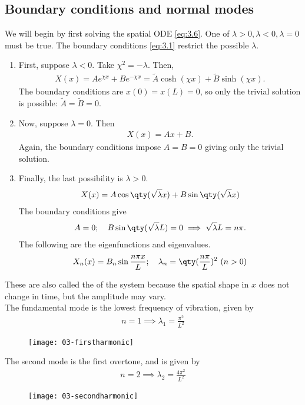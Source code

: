 \subsection{Boundary conditions and normal modes}
We will begin by first solving the spatial ODE \cref{eq:3.6}.
One of $\lambda > 0, \lambda < 0, \lambda = 0$ must be true.
The boundary conditions \cref{eq:3.1} restrict the possible $\lambda$.
\begin{enumerate}
	\item First, suppose $\lambda < 0$.
	      Take $\chi^2 = -\lambda$.
	      Then,
	      \begin{align*}
		      X(x) = Ae^{\chi x} + Be^{-\chi x} = \tilde A \cosh (\chi x) + \tilde B \sinh (\chi x).
	      \end{align*}
	      The boundary conditions are $x(0) = x(L) = 0$, so only the trivial solution is possible: $\tilde A = \tilde B = 0$.
	\item Now, suppose $\lambda = 0$.
	      Then
	      \begin{align*}
		      X(x) = Ax + B.
	      \end{align*}
	      Again, the boundary conditions impose $A = B = 0$ giving only the trivial solution.
	\item Finally, the last possibility is $\lambda > 0$.
	      \begin{align*}
		      X(x) = A \cos \qty(\sqrt{\lambda} x) + B \sin \qty(\sqrt{\lambda} x)
	      \end{align*}
	      The boundary conditions give
	      \begin{align*}
		      A = 0;\quad B \sin \qty(\sqrt{\lambda} L) = 0 \implies \sqrt{\lambda} L = n \pi.
	      \end{align*}
		  The following are the eigenfunctions and eigenvalues.
		\begin{align}
			X_n(x) = B_n \sin \frac{n \pi x}{L};\quad \lambda_n = \qty(\frac{n \pi}{L})^2 \ (n > 0) \label{eq:3.8}
		\end{align}
\end{enumerate}

These are also called the  of the system because the spatial shape in $x$ does not change in time, but the amplitude may vary. \\
The fundamental mode is the lowest frequency of vibration, given by
\begin{align*}
	n = 1 \implies \lambda_1 = \frac{\pi^2}{L^2}
\end{align*}
\begin{figure}[h] 
    \centering 
    \texttt{[image: 03-firstharmonic]} 
\end{figure}
The second mode is the first overtone, and is given by
\begin{align*}
	n = 2 \implies \lambda_2 = \frac{4\pi^2}{L^2}
\end{align*}
\begin{figure}[h] 
    \centering 
    \texttt{[image: 03-secondharmonic]} 
\end{figure}

